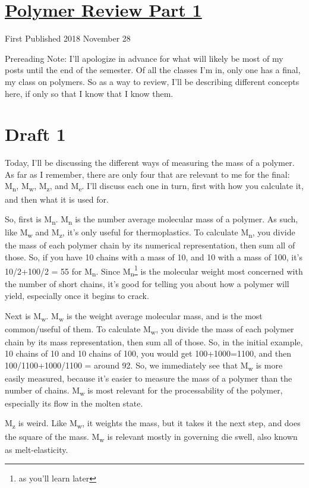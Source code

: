 \documentclass[12pt]{article}[titlepage]
\newcommand{\1}{\={a}}
\newcommand{\2}{\={e}}
\newcommand{\3}{\={\i}}
\newcommand{\4}{\=o}
\newcommand{\5}{\=u}
\newcommand{\6}{\={A}}
\newcommand{\sub}[1]{\textsubscript{#1}}
\renewcommand{\,}{\textsuperscript{,}}
\begin{document}
\doublespacing
\section{\href{polymer-1.html}{Polymer Review Part 1}}
First Published 2018 November 28

Prereading Note: I'll apologize in advance for what will likely be most of my posts until the end of the semester.
Of all the classes I'm in, only one has a final, my class on polymers.
So as a way to review, I'll be describing different concepts here, if only so that I know that I know them.
\section{Draft 1}
Today, I'll be discussing the different ways of measuring the mass of a polymer.
As far as I remember, there are only four that are relevant to me for the final: M\sub{n}, M\sub{w}, M\sub{z}, and M\sub{e}.
I'll discuss each one in turn, first with how you calculate it, and then what it is used for.

So, first is M\sub{n}.
M\sub{n} is the number average molecular mass of a polymer.
As such, like M\sub{w} and M\sub{z}, it's only useful for thermoplastics.
To calculate M\sub{n}, you divide the mass of each polymer chain by its numerical representation, then sum all of those.
So, if you have 10 chains with a mass of 10, and 10 with a mass of 100, it's 10/2+100/2 = 55 for M\sub{n}.
Since M\sub{n}\footnote{as you'll learn later} is the molecular weight most concerned with the number of short chains, it's good for telling you about how a polymer will yield, especially once it begins to crack.

Next is M\sub{w}.
M\sub{w} is the weight average molecular mass, and is the most common/useful of them.
To calculate M\sub{w}, you divide the mass of each polymer chain by its mass representation, then sum all of those.
So, in the initial example, 10 chains of 10 and 10 chains of 100, you would get 100+1000=1100, and then 100/1100+1000/1100 = around 92.
So, we immediately see that M\sub{w} is more easily measured, because it's easier to measure the mass of a polymer than the number of chains.
M\sub{w} is most relevant for the processability of the polymer, especially its flow in the molten state.

M\sub{z} is weird.
Like M\sub{w}, it weights the mass, but it takes it the next step, and does the square of the mass.
M\sub{w} is relevant mostly in governing die swell, also known as melt-elasticity.
\end{document}
